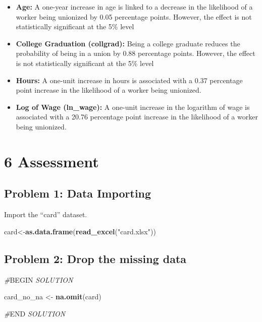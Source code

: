 \documentclass[
]{article}
\newenvironment{Shaded}{\begin{snugshade}}{\end{snugshade}}
\newcommand{\CommentTok}[1]{\textcolor[rgb]{0.56,0.35,0.01}{\textit{#1}}}
\newcommand{\FunctionTok}[1]{\textcolor[rgb]{0.13,0.29,0.53}{\textbf{#1}}}
\newcommand{\NormalTok}[1]{#1}
\newcommand{\OtherTok}[1]{\textcolor[rgb]{0.56,0.35,0.01}{#1}}
\newcommand{\RegionMarkerTok}[1]{#1}
\newcommand{\StringTok}[1]{\textcolor[rgb]{0.31,0.60,0.02}{#1}}
\begin{document}
\begin{itemize}
\item
  \textbf{Age:} A one-year increase in age is linked to a decrease in
  the likelihood of a worker being unionized by 0.05 percentage points.
  However, the effect is not statistically significant at the 5\% level
\item
  \textbf{College Graduation (collgrad):} Being a college graduate
  reduces the probability of being in a union by 0.88 percentage points.
  However, the effect is not statistically significant at the 5\% level
\item
  \textbf{Hours:} A one-unit increase in hours is associated with a 0.37
  percentage point increase in the likelihood of a worker being
  unionized.
\item
  \textbf{Log of Wage (ln\_wage):} A one-unit increase in the logarithm
  of wage is associated with a 20.76 percentage point increase in the
  likelihood of a worker being unionized.
\end{itemize}

\section{6 Assessment}\label{assessment}

\subsection{Problem 1: Data Importing}\label{problem-1-data-importing}

Import the ``card'' dataset.

\begin{Shaded}
\begin{Highlighting}[]
\NormalTok{card}\OtherTok{\textless{}{-}}\FunctionTok{as.data.frame}\NormalTok{(}\FunctionTok{read\_excel}\NormalTok{(}\StringTok{"card.xlsx"}\NormalTok{))}
\end{Highlighting}
\end{Shaded}

\subsection{Problem 2: Drop the missing
data}\label{problem-2-drop-the-missing-data}

\begin{Shaded}
\begin{Highlighting}[]
\CommentTok{\#}\RegionMarkerTok{BEGIN}\CommentTok{ SOLUTION}

\NormalTok{card\_no\_na }\OtherTok{\textless{}{-}} \FunctionTok{na.omit}\NormalTok{(card)}


\CommentTok{\#}\RegionMarkerTok{END}\CommentTok{ SOLUTION}
\end{Highlighting}
\end{Shaded}
\end{document}

